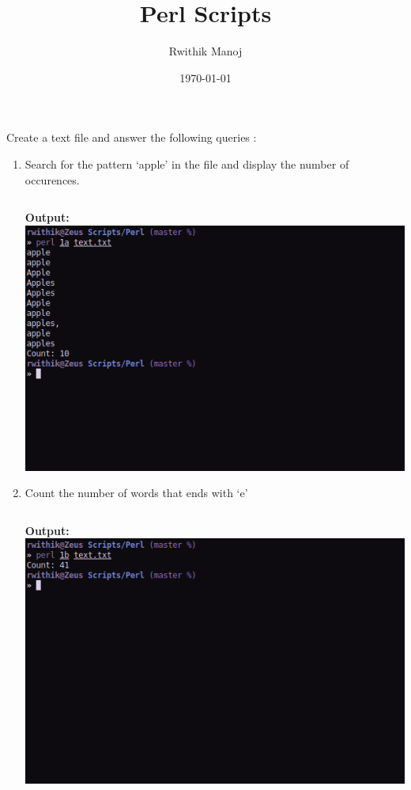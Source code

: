 \documentclass[10pt,a4paper,titlepage]{report}
\begin{document}
\begin{titlepage}
\author{Rwithik Manoj}
\title{Perl Scripts}
\date{\today}
\maketitle
\end{titlepage}

Create a text file and answer the following queries :
\begin{enumerate}
	\item Search for the pattern `apple’ in the file and display the number of occurences.
	\par
	\newline
	\inputminted[tabsize=4]{perl}{../Scripts/Perl/1a}
	\textbf{Output: }\newline
	\includegraphics[width=\linewidth]{../Images/Perl/1a.png}
	\pagebreak
	\item Count the number of words that ends with `e’
	\par
	\newline
	\inputminted[tabsize=4]{perl}{../Scripts/Perl/1b}
	\textbf{Output: }\newline
	\includegraphics[width=\linewidth]{../Images/Perl/1b.png}

\end{enumerate}
\end{document}
